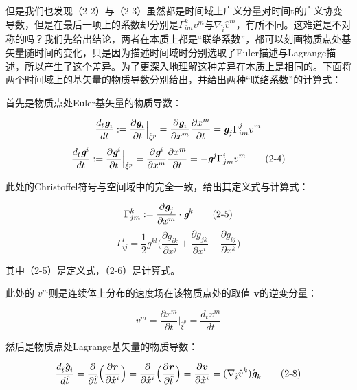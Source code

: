 \documentclass[UTF8]{ctexart}
\begin{document}
但是我们也发现（2-2）与（2-3）虽然都是时间域上广义分量对时间t的广义协变导数，但是在最后一项上的系数却分别是$\Gamma_{im}^{k} v^m$与$\nabla_{\hat{i}} \hat{v}^m$，有所不同。这难道是不对称的吗？我们先给出结论，两者在本质上都是“联络系数”，都可以刻画物质点处基矢量随时间的变化，只是因为描述时间域时分别选取了Euler描述与Lagrange描述，所以产生了这个差异。为了更深入地理解这种差异在本质上是相同的。下面将两个时间域上的基矢量的物质导数分别给出，并给出两种“联络系数”的计算式：\par
首先是物质点处Euler基矢量的物质导数：\par
\begin{equation*}
    \frac{d_t \textit{\textbf{g}}_i}{dt}:=\frac{\partial \textit{\textbf{g}}_i}{\partial t}\Big|_{\hat{\xi}^p}=\frac{\partial \textit{\textbf{g}}_i}{\partial x^m}\frac{\partial x^m}{\partial t}= \textit{\textbf{g}}_j\Gamma_{im}^j v^m
\end{equation*}
\begin{equation*}
    \frac{d_t \textit{\textbf{g}}^i}{dt}:=\frac{\partial \textit{\textbf{g}}^i}{\partial t}\Big|_{\hat{\xi}^p}=\frac{\partial \textit{\textbf{g}}^i}{\partial x^m}\frac{\partial x^m}{\partial t}=- \textit{\textbf{g}}^j\Gamma_{jm}^i v^m
    \tag{2-4}
\end{equation*}
\par
此处的Christoffel符号与空间域中的完全一致，给出其定义式与计算式：\par
\begin{equation*}
    \Gamma_{jm}^k := \frac{\partial \textit{\textbf{g}}_j}{\partial x^m}\cdot \textit{\textbf{g}}^k
    \tag{2-5}
\end{equation*}
\begin{equation*}
    \Gamma_{ij}^l = \frac{1}{2} g^{kl}\Big( \frac{\partial g_{ik}}{\partial x^j}
    +\frac{\partial g_{jk}}{\partial x^i} -\frac{\partial g_{ij}}{\partial x^k} \Big)
    \tag{2-6}
\end{equation*}
\par
其中（2-5）是定义式，（2-6）是计算式。\par
此处的 $v^m$则是连续体上分布的速度场在该物质点处的取值 $\textbf{v}$的逆变分量：\par
\begin{equation*}
    v^m=\frac{\partial x^m}{\partial t}\Big|_{\hat{\xi}^p}=\frac{d_t x^m}{dt}
    \tag{2-7}
\end{equation*}
\par
然后是物质点处Lagrange基矢量的物质导数：\par
\begin{equation*}
     \frac{d_{\hat{t}} \hat{\textit{\textbf{g}}}_i}{d\hat{t}}=
     \frac{\partial}{\partial \hat{t}}
     \Big(\frac{\partial\textbf{\textit{r}}}{\partial \hat x^i}\Big)=
     \frac{\partial}{\partial \hat x^i}
     \Big(\frac{\partial\textbf{\textit{r}}}{\partial \hat{t}}\Big)=
     \frac{\partial\textbf{\textit{v}}}{\partial \hat x^i}=
     (\nabla_{\hat{i}} {\hat{v}}^k) \hat{\textit{\textbf{g}}}_k
     \tag{2-8}
\end{equation*}
\end{document}
